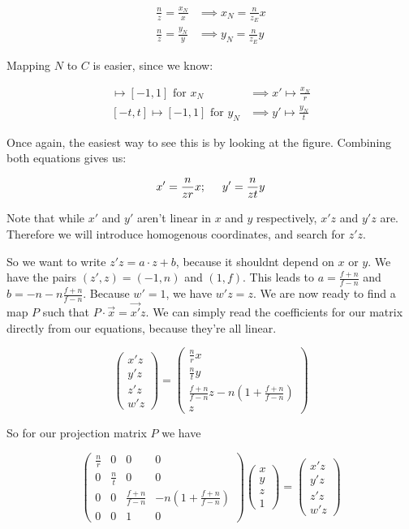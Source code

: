 \documentclass{article}
\begin{document}
\begin{align*}
	\frac{n}{z} = \frac{x_N}{x} &\implies x_N = \frac{n}{z_E} x\\	 
	\frac{n}{z} = \frac{y_N}{y} &\implies y_N = \frac{n}{z_E} y
\end{align*}

Mapping $N$ to $C$ is easier, since we know:

\begin{align*}
	[-r, r] \mapsto [-1, 1] \text{ for } x_N &\implies x' \mapsto \frac{x_N}{r} \\
 [-t, t] \mapsto [-1, 1] \text{ for } y_N &\implies y' \mapsto \frac{y_N}{t}
\end{align*}

Once again, the easiest way to see this is by looking at the figure. Combining both equations gives us:

$$x' = \frac{n}{z r} x; \hspace{0.5 cm} y' = \frac{n}{z t} y$$

Note that while $x'$ and $y'$ aren't linear in $x$ and $y$ respectively, $x'z$ and $y'z$ are. Therefore we will introduce homogenous coordinates, and search for $z'z$.

So we want to write $z'z = a \cdot z + b$, because it shouldnt depend on $x$ or $y$. We have the pairs $(z', z) = (-1, n)$ and $(1, f)$. This leads to $a = \frac{f+n}{f-n}$ and $b = -n -n \frac{f+n}{f-n}$. Because $w' = 1$, we have $w'z = z$. We are now ready to find a map $P$ such that $P \cdot \vec{x} = \vec{x'}z$. We can simply read the coefficients for our matrix directly from our equations, because they're all linear. 

$$\begin{pmatrix} x'z\\y'z\\z'z\\w'z \end{pmatrix} = \begin{pmatrix} \frac{n}{r} x\\\frac{n}{t} y\\\frac{f+n}{f-n}z - n(1 + \frac{f+n}{f-n})\\z \end{pmatrix}$$

So for our projection matrix $P$ we have

$$\begin{pmatrix} \frac{n}{r}&0&0&0 \\ 0&\frac{n}{t}&0&0 \\ 0&0&\frac{f+n}{f-n}&- n(1 + \frac{f+n}{f-n}) \\ 0&0&1&0 \end{pmatrix} \begin{pmatrix} x\\y\\z\\1 \end{pmatrix} = \begin{pmatrix} x'z\\y'z\\z'z\\w'z \end{pmatrix}$$
\end{document}
